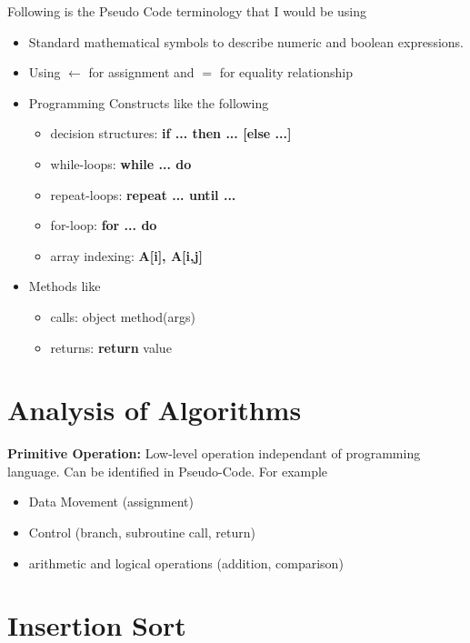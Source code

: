 	Following is the Pseudo Code terminology that I would be using 
	\begin{itemize}
		\item Standard mathematical symbols to describe numeric and boolean expressions.
		\item Using $\gets$ for assignment and $=$ for equality relationship
		\item Programming Constructs like the following
		\begin{itemize}
			\item decision structures: \textbf{if ... then ... [else ...]}
			\item while-loops: \textbf{while ... do}
			\item repeat-loops: \textbf{repeat ... until ...}
			\item for-loop: \textbf{for ... do}
			\item array indexing: \textbf{A[i], A[i,j]}
		\end{itemize}
		\item Methods like
		\begin{itemize}
			\item calls: object method(args)
			\item returns: \textbf{return} value
		\end{itemize}
	\end{itemize}

	\section{Analysis of Algorithms}
	\textbf{Primitive Operation:} Low-level operation independant of programming language. Can be identified in Pseudo-Code. For example
	\begin{itemize}
		\item Data Movement (assignment)
		\item Control (branch, subroutine call, return)
		\item arithmetic and logical operations (addition, comparison)
	\end{itemize}
	\section{Insertion Sort}
	\begin{algorithm}[H]
		\label{alg:1}
	\end{algorithm}
